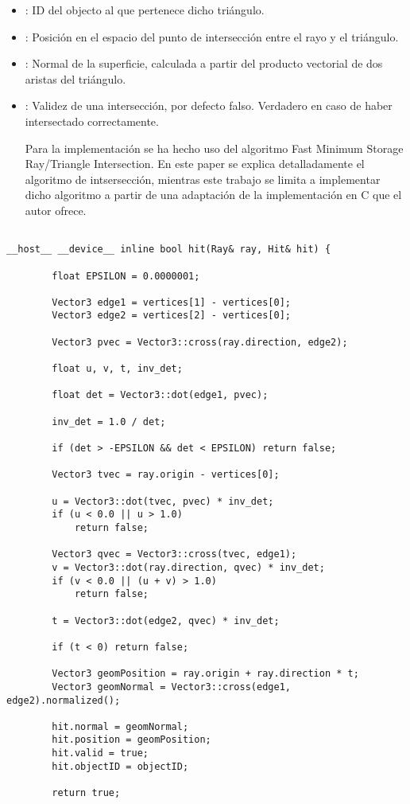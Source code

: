 \begin{itemize}
	
	\item {}: ID del objecto al que pertenece dicho triángulo.
	
	\item {}: Posición en el espacio del punto de intersección entre el rayo y el triángulo.
	
	\item {}: Normal de la superficie, calculada a partir del producto vectorial de dos aristas del triángulo.
	
	\item {}: Validez de una intersección, por defecto falso. Verdadero en caso de haber intersectado correctamente.

Para la implementación se ha hecho uso del algoritmo Fast Minimum Storage Ray/Triangle Intersection\cite{triintersection}. En este paper se explica detalladamente el algoritmo de intsersección, mientras este trabajo se limita a implementar dicho algoritmo a partir de una adaptación de la implementación en C que el autor ofrece.


\end{itemize}
	
\begin{lstlisting}
	
__host__ __device__ inline bool hit(Ray& ray, Hit& hit) {

        float EPSILON = 0.0000001;

        Vector3 edge1 = vertices[1] - vertices[0];
        Vector3 edge2 = vertices[2] - vertices[0];

        Vector3 pvec = Vector3::cross(ray.direction, edge2);

        float u, v, t, inv_det;

        float det = Vector3::dot(edge1, pvec);

        inv_det = 1.0 / det;

        if (det > -EPSILON && det < EPSILON) return false;

        Vector3 tvec = ray.origin - vertices[0];

        u = Vector3::dot(tvec, pvec) * inv_det;
        if (u < 0.0 || u > 1.0)
            return false;

        Vector3 qvec = Vector3::cross(tvec, edge1);
        v = Vector3::dot(ray.direction, qvec) * inv_det;
        if (v < 0.0 || (u + v) > 1.0)
            return false;

        t = Vector3::dot(edge2, qvec) * inv_det;

        if (t < 0) return false;

        Vector3 geomPosition = ray.origin + ray.direction * t;
		Vector3 geomNormal = Vector3::cross(edge1, edge2).normalized();
		
		hit.normal = geomNormal;
		hit.position = geomPosition;
		hit.valid = true;
		hit.objectID = objectID;

        return true;

\end{lstlisting}

